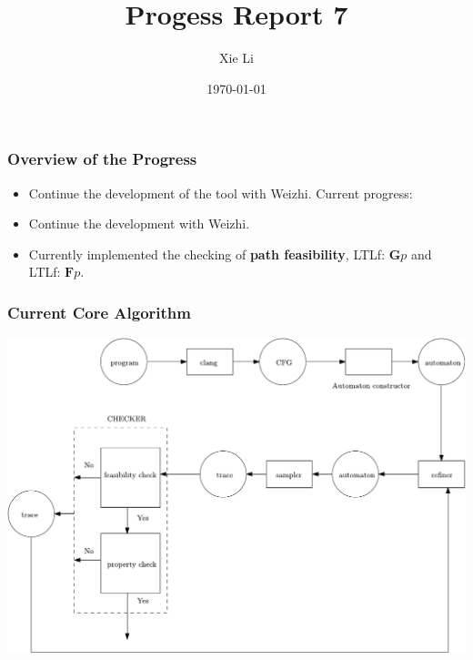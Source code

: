 \documentclass[11pt]{beamer}
\title{Progess Report 7}
\date{\today}
\author{Xie Li}
\begin{document}
\maketitle

\begin{frame}\frametitle{Overview of the Progress}
\begin{itemize}
\item Continue the development of the tool with Weizhi. Current progress:
\item Continue the development with Weizhi.
\item Currently implemented the checking of \textbf{path feasibility}, LTLf: $\mathbf{G}p$ and LTLf: $\textbf{F}p$.
\end{itemize}

\end{frame}


\begin{frame}\frametitle{Current Core Algorithm}

\begin{center}
\includegraphics[scale=0.5]{flowgraph.pdf}
\end{center}

\end{frame}
\end{document}
